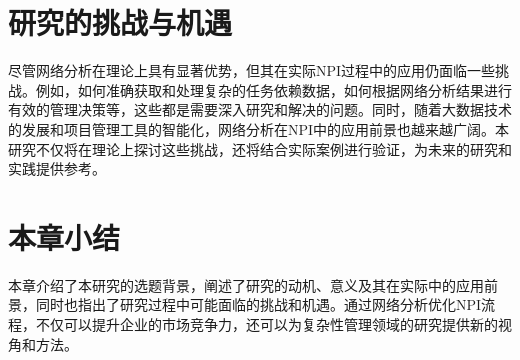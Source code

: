 \section{研究的挑战与机遇}
尽管网络分析在理论上具有显著优势，但其在实际NPI过程中的应用仍面临一些挑战。例如，如何准确获取和处理复杂的任务依赖数据，如何根据网络分析结果进行有效的管理决策等，这些都是需要深入研究和解决的问题。同时，随着大数据技术的发展和项目管理工具的智能化，网络分析在NPI中的应用前景也越来越广阔。本研究不仅将在理论上探讨这些挑战，还将结合实际案例进行验证，为未来的研究和实践提供参考。

\section{本章小结}
本章介绍了本研究的选题背景，阐述了研究的动机、意义及其在实际中的应用前景，同时也指出了研究过程中可能面临的挑战和机遇。通过网络分析优化NPI流程，不仅可以提升企业的市场竞争力，还可以为复杂性管理领域的研究提供新的视角和方法。

